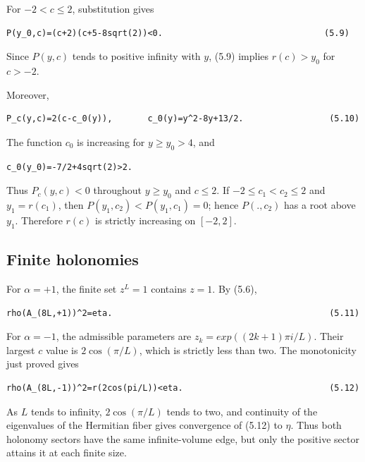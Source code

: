For \(-2<c\le 2\), substitution gives

\begin{lstlisting}[language={}]
P(y_0,c)=(c+2)(c+5-8sqrt(2))<0.                                (5.9)
\end{lstlisting}

Since \(P(y,c)\) tends to positive infinity with \(y\), (5.9) implies
\(r(c)>y_0\) for \(c>-2\).

Moreover,

\begin{lstlisting}[language={}]
P_c(y,c)=2(c-c_0(y)),       c_0(y)=y^2-8y+13/2.                 (5.10)
\end{lstlisting}

The function \(c_0\) is increasing for \(y\ge y_0>4\), and

\begin{lstlisting}[language={}]
c_0(y_0)=-7/2+4sqrt(2)>2.
\end{lstlisting}

Thus \(P_c(y,c)<0\) throughout \(y\ge y_0\) and \(c\le 2\). If
\(-2\le c_1<c_2\le 2\) and \(y_1=r(c_1)\), then
\(P(y_1,c_2)<P(y_1,c_1)=0\); hence \(P(.,c_2)\) has a root above \(y_1\).
Therefore \(r(c)\) is strictly increasing on \([-2,2]\).

\subsection{Finite holonomies}

For \(\alpha=+1\), the finite set \(z^L=1\) contains \(z=1\). By (5.6),

\begin{lstlisting}[language={}]
rho(A_(8L,+1))^2=eta.                                           (5.11)
\end{lstlisting}

For \(\alpha=-1\), the admissible parameters are
\(z_k=exp((2k+1)\pi i/L)\). Their largest \(c\) value is \(2\operatorname{cos}(\pi/L)\), which is
strictly less than two. The monotonicity just proved gives

\begin{lstlisting}[language={}]
rho(A_(8L,-1))^2=r(2cos(pi/L))<eta.                             (5.12)
\end{lstlisting}

As \(L\) tends to infinity, \(2\operatorname{cos}(\pi/L)\) tends to two, and continuity of the
eigenvalues of the Hermitian fiber gives convergence of (5.12) to \(\eta\).
Thus both holonomy sectors have the same infinite-volume edge, but only the
positive sector attains it at each finite size.
